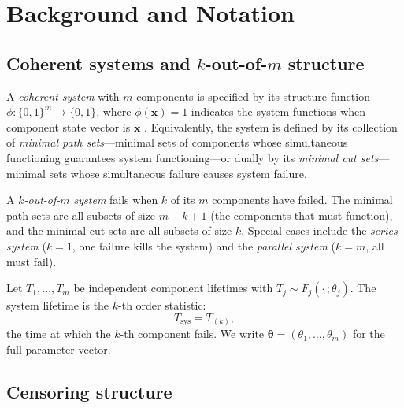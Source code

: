 \documentclass[12pt]{article}
\newcommand{\Tsys}{T_{\mathrm{sys}}}
\newcommand{\btheta}{\boldsymbol{\theta}}
\newcommand{\bx}{\mathbf{x}}
\begin{document}

\section{Background and Notation}\label{sec:background}

\subsection{Coherent systems and \texorpdfstring{$k$-out-of-$m$}{k-out-of-m} structure}
\label{sec:coherent}

A \emph{coherent system} with $m$ components is specified by its structure
function $\phi: \{0,1\}^m \to \{0,1\}$, where $\phi(\bx) = 1$ indicates
the system functions when component state vector is $\bx$
\citep{BarlowProschan1975}.  Equivalently, the system is defined by its
collection of \emph{minimal path sets}---minimal sets of components whose
simultaneous functioning guarantees system functioning---or dually by its
\emph{minimal cut sets}---minimal sets whose simultaneous failure causes
system failure.

A \emph{$k$-out-of-$m$ system} fails when $k$ of its $m$ components
have failed.  The minimal path sets are all subsets of size $m - k + 1$
(the components that must function), and the minimal cut sets are all
subsets of size $k$.  Special cases include the \emph{series system}
($k = 1$, one failure kills the system) and the \emph{parallel system}
($k = m$, all must fail).

Let $T_1, \ldots, T_m$ be independent component lifetimes with
$T_j \sim F_j(\cdot\,; \theta_j)$.  The system lifetime is the $k$-th
order statistic:
\begin{equation}\label{eq:tsys}
  \Tsys = T_{(k)},
\end{equation}
the time at which the $k$-th component fails.  We write $\btheta = (\theta_1,
\ldots, \theta_m)$ for the full parameter vector.

\subsection{Censoring structure}\label{sec:censoring}
\end{document}
